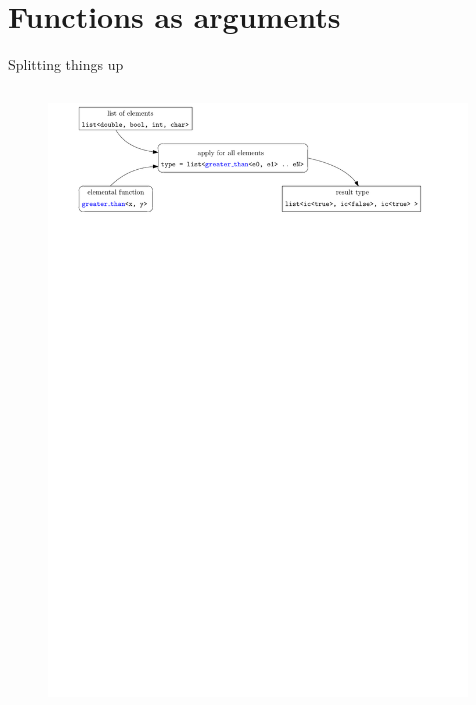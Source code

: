 \documentclass[xcolor=dvipsnames]{beamer}
\begin{document}
\section{Functions as arguments}


\begin{frame}[fragile]{Splitting things up}
  \begin{columns}[T] %
    \begin{column}{1.05\textwidth}
      \begin{figure}[H]
        \centering
        \includegraphics[width=0.99\textwidth]{second_order_func}
      \end{figure}
    \end{column}%
  \end{columns}
\end{frame}
\end{document}
